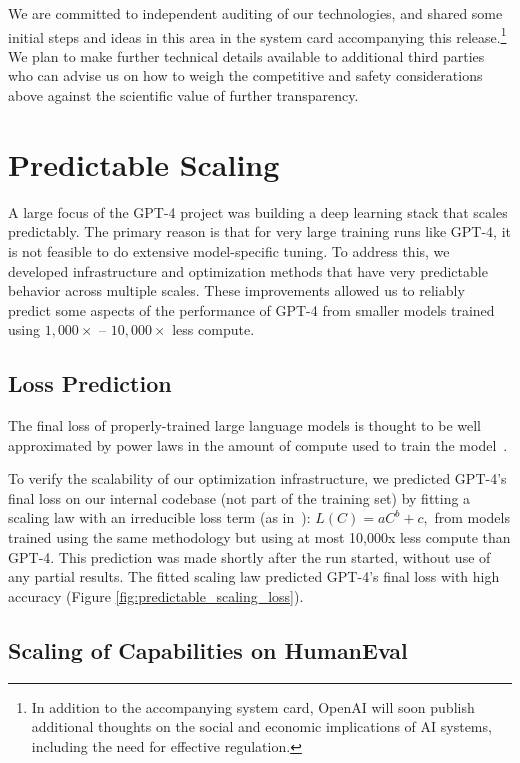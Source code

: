 We are committed to independent auditing of our technologies, and shared some initial steps and ideas in this area in the system card accompanying this release.\footnote{In addition to the accompanying system card, OpenAI will soon publish additional thoughts on the social and economic implications of AI systems, including the need for effective regulation.} We plan to make further technical details available to additional third parties who can advise us on how to weigh the competitive and safety considerations above against the scientific value of further transparency.

\section{Predictable Scaling}

A large focus of the GPT-4 project was building a deep learning stack that scales predictably. The primary reason is that for very large training runs like GPT-4, it is not feasible to do extensive model-specific tuning. To address this, we developed infrastructure and optimization methods that have very predictable behavior across multiple scales. These improvements allowed us to reliably predict some aspects of the performance of GPT-4 from smaller models trained using $1,000\times$ -- $10,000\times$ less compute.

\subsection{Loss Prediction}

The final loss of properly-trained large language models is thought to be well approximated by power laws in the amount of compute used to train the model~\citep{hestness2017deep, thompson2020computational, hoffmann2022training,kaplan2020scaling,henighan2020scaling}.

To verify the scalability of our optimization infrastructure, we predicted GPT-4's final loss on our internal codebase (not part of the training set) by fitting a scaling law with an irreducible loss term (as in~\citet{henighan2020scaling}): $L(C) = aC^b + c,$ from models trained using the same methodology but using at most 10,000x less compute than GPT-4. This prediction was made shortly after the run started, without use of any partial results. The fitted scaling law predicted GPT-4's final loss with high accuracy (Figure \ref{fig:predictable_scaling_loss}). 

\subsection{Scaling of Capabilities on HumanEval}

